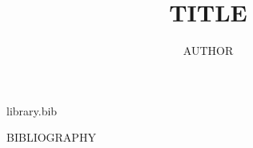 %
%
\begin{filecontents}{library.bib}

BIBLIOGRAPHY

\end{filecontents}


%
%
\documentclass{llncs}

\usepackage{graphicx}
\usepackage{hyperref}
\usepackage[utf8]{inputenc}

\makeatletter
\def\maxwidth#1{\ifdim\Gin@nat@width>#1 #1\else\Gin@nat@width\fi}
\makeatother




\title{TITLE}

\author{AUTHOR}


\maketitle              %

\begin{abstract}

ABSTRACT

\end{abstract}

CONTENT


\nocite{*}


